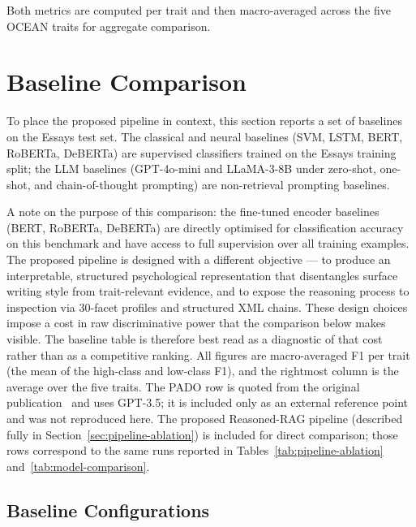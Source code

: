 \documentclass[../main.tex]{subfiles}
\begin{document}
Both metrics are computed per trait and then macro-averaged across the five
OCEAN traits for aggregate comparison.

\section{Baseline Comparison}
\label{sec:baselines}

To place the proposed pipeline in context, this section reports a set of
baselines on the Essays test set. The classical and neural baselines (SVM,
LSTM, BERT, RoBERTa, DeBERTa) are supervised classifiers trained on the Essays
training split; the LLM baselines (GPT-4o-mini and LLaMA-3-8B under zero-shot,
one-shot, and chain-of-thought prompting) are non-retrieval prompting
baselines.

A note on the purpose of this comparison: the fine-tuned encoder baselines
(BERT, RoBERTa, DeBERTa) are directly optimised for classification accuracy on
this benchmark and have access to full supervision over all training examples.
The proposed pipeline is designed with a different objective --- to produce an
interpretable, structured psychological representation that disentangles surface
writing style from trait-relevant evidence, and to expose the reasoning process
to inspection via 30-facet profiles and structured XML chains.
These design choices impose a cost in raw discriminative power that the
comparison below makes visible. The baseline table is therefore best read as
a diagnostic of that cost rather than as a competitive ranking.
All figures are macro-averaged F1 per trait (the mean of the high-class and
low-class F1), and the rightmost column is the average over the five traits.
The PADO row is quoted from the original publication~\cite{yeo2025pado} and uses
GPT-3.5; it is included only as an external reference point and was not
reproduced here.
The proposed Reasoned-RAG pipeline (described fully in
Section~\ref{sec:pipeline-ablation}) is included for direct comparison;
those rows correspond to the same runs reported in
Tables~\ref{tab:pipeline-ablation} and~\ref{tab:model-comparison}.

\subsection{Baseline Configurations}
\label{sec:baseline-config}
\end{document}
